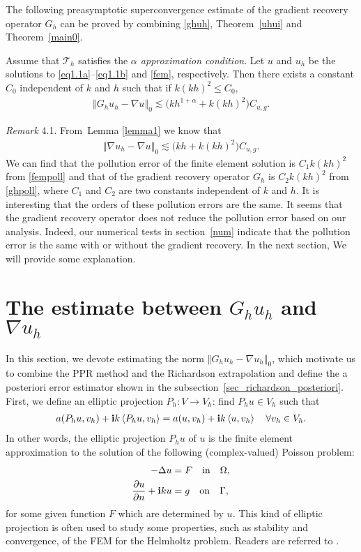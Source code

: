 \documentclass[leqno,final]{siamltex}
\numberwithin{equation}{section}
\newcommand{\norm}[1]{\left\Vert#1\right\Vert}
\newcommand{\pd}[1]{\left\langle #1\right\rangle}
\newcommand{\ls}{\lesssim}
\newcommand{\al}{\alpha}
\newcommand{\De}{\Delta}
\newcommand{\Ga}{\Gamma}
\newcommand{\na}{\nabla}
\newcommand{\Om}{\Omega}
\newcommand{\pa}{\partial}
\renewcommand{\i}{{\rm\mathbf i}}
\newcommand{\T}{\mathcal{T}}
\newcommand{\eq}[1]{\begin{align}#1\end{align}}
\begin{document}
The following preasymptotic superconvergence estimate of the gradient recovery operator $G_h$
can be proved by combining \eqref{ghuh}, Theorem~\ref{uhui} and Theorem~\ref{main0}.
\begin{theorem} \label{main1}
Assume that $\T_h$ satisfies the \emph{$\al$ approximation condition}.
Let $u$ and $u_h$ be the solutions to \eqref{eq1.1a}--\eqref{eq1.1b} and \eqref{fem}, respectively.
Then there exists a constant $C_0$ independent of $k$ and $h$ such that if $k(kh)^2\leq C_0$,
\eq{ \norm{G_hu_h-\na u}_0\ls \big(kh^{1+\al}+k(kh)^2\big)  C_{u,g}. \label{ghpoll} }
\end{theorem}

\emph{Remark} 4.1. From~Lemma \ref{lemma1} we know that
\eq{ \norm{\na u_h-\na u}_0 \ls \big(kh+k(kh)^2\big) C_{u,g}. \label{fempoll} }
We can find that the pollution error of the finite element solution is $C_1k(kh)^2$ from
\eqref{fempoll} and that of the gradient recovery operator $G_h$ is $C_2k(kh)^2$ from \eqref{ghpoll}, where
$C_1$ and $C_2$ are two constants independent of $k$ and $h$.
It is interesting that the orders of these pollution errors are the same.
It seems that the gradient recovery operator does not reduce the pollution error based on our analysis.
Indeed, our numerical tests in section~\ref{num} indicate that the pollution error is the same with or without the gradient recovery.
In the next section, We will provide some explanation.

\section{The estimate between $G_hu_h$ and $\na u_h$} \label{est}
In this section, we devote estimating the norm $\norm{G_hu_h-\na u_h}_0$, which motivate us to
combine the PPR method and the Richardson extrapolation and define the a posteriori error estimator shown in the subsection~\ref{sec_richardson_posteriori}.
First, we define an elliptic projection $P_h:V\rightarrow V_h$:
find $P_hu\in V_h$ such that
\eq{ a(P_hu,v_h)+\i k\pd{P_hu,v_h}=a(u,v_h)+\i k\pd{u,v_h}\quad \forall v_h\in V_h.\label{ellpro}}
In other words, the elliptic projection $P_hu$ of $u$ is the finite element approximation
to the solution of the following (complex-valued) Poisson problem:
\eq{ -\De u &= F \quad \mathrm{in} \quad \Om,\label{eq2.2a}\\
\frac{\pa u}{\pa n} + \i ku &= g \quad \mathrm{on}\quad \Ga,\label{eq2.2b}  }
for some given function $F$ which are determined by $u$.
This kind of elliptic projection is often used to study some properties,
such as stability and convergence, of the FEM for the Helmholtz problem.  Readers are referred to \cite{zw,zd,dzh,dw}.
\end{document}

